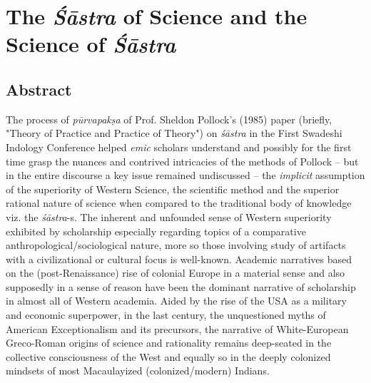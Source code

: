 
\chapter{The \textit{Śāstra} of Science and the Science of \textit{Śāstra}}\label{chapter6}


\vskip 2pt

\section*{Abstract}

\vskip 2pt

The process of \textit{pūrvapakṣa} of Prof. Sheldon Pollock’s (1985) paper (briefly, "Theory of Practice and Practice of Theory") on \textit{śāstra} in the First Swadeshi Indology Conference helped \textit{emic} scholars understand and possibly for the first time grasp the nuances and contrived intricacies of the methods of Pollock – but in the entire discourse a key issue remained undiscussed – the \textit{implicit} assumption of the superiority of Western Science, the scientific method and the superior rational nature of science when compared to the traditional body of knowledge viz. the \textit{śāstra}-s. The inherent and unfounded sense of Western superiority exhibited by scholarship especially regarding topics of a comparative anthropological/sociological nature, more so those involving study of artifacts with a civilizational or cultural focus is well-known. Academic narratives based on the (post-Renaissance) rise of colonial Europe in a material sense and also supposedly in a sense of reason have been the dominant narrative of scholarship in almost all of Western academia. Aided by the rise of the USA as a military and economic superpower, in the last century, the unquestioned myths of American Exceptionalism and its precursors, the narrative of White-European Greco-Roman origins of science and rationality remains deep-seated in the collective consciousness of the West and equally so in the deeply colonized mindsets of most Macaulayized (colonized/modern) Indians.

